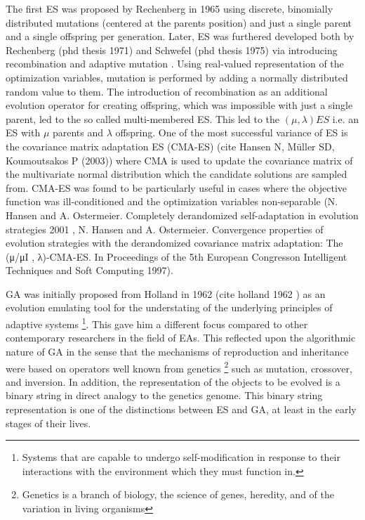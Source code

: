 The first ES was proposed by Rechenberg in 1965 using discrete, binomially distributed mutations (centered at the parents position) and just a single parent and a single offspring per generation. Later, ES was furthered developed both by Rechenberg (phd thesis 1971) and Schwefel (phd thesis 1975) via introducing recombination and adaptive mutation \cite{Rechenberg}. Using real-valued representation of the optimization variables, mutation is performed by adding a normally distributed random value to them. The introduction of recombination as an additional evolution operator for creating offspring, which was impossible with just a single parent, led to the so called multi-membered ES. This led to the $(\mu, \lambda)ES$ i.e. an ES with $\mu$ parents and $\lambda$ offspring. One of the most successful variance of ES is the covariance matrix adaptation ES (CMA-ES) (cite Hansen N, Müller SD, Koumoutsakos P (2003)) where CMA is used to update the covariance matrix of the multivariate normal distribution which the candidate solutions are sampled from. CMA-ES was found to be particularly useful in cases where the objective function was ill-conditioned and the optimization variables non-separable (N. Hansen and A. Ostermeier. Completely derandomized self-adaptation in evolution strategies 2001 , N. Hansen and A. Ostermeier. Convergence properties of evolution strategies with the derandomized covariance matrix adaptation: The (μ/μI , λ)-CMA-ES. In Proceedings of the 5th European Congresson Intelligent Techniques and Soft Computing 1997).  

GA was initially proposed from Holland in 1962 (cite holland 1962 \cite{holland_1975}) as an evolution emulating tool for the understating of the underlying principles
of adaptive systems \footnote{Systems that are capable to undergo self-modification in response to their interactions with the environment which they must function in.}. This gave him a different focus compared to other contemporary researchers in the field of EAs. This reflected upon the algorithmic nature of GA in the sense that the mechanisms of reproduction and inheritance were based on operators well known from genetics \footnote{Genetics is a branch of biology, the science of genes, heredity, and of the variation in living organisms} such as mutation, crossover, and inversion. In addition, the representation of the objects to be evolved is a binary string in direct analogy to the genetics genome. This binary string representation is one of the distinctions between ES and GA, at least in the early stages of their lives.  
 
